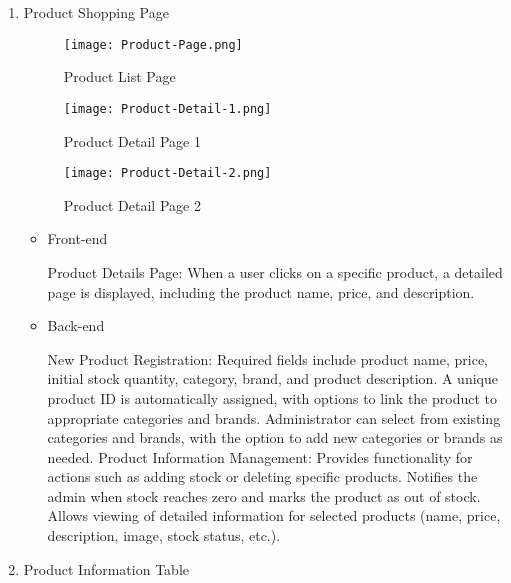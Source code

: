 \documentclass[conference]{IEEEtran}
\begin{document}
\begin{enumerate}
\setlength{\parindent}{2ex}
\item Product Shopping Page

\begin{figure}[H]
    \centering
    \texttt{[image: Product-Page.png]}
    \caption{Product List Page}
    \label{fig:Product List Page}
\end{figure}

\begin{figure}[H]
    \centering
    \texttt{[image: Product-Detail-1.png]}
    \caption{Product Detail Page 1}
    \label{fig:Product Detail Page 1}
\end{figure}

\begin{figure}[H]
    \centering
    \texttt{[image: Product-Detail-2.png]}
    \caption{Product Detail Page 2}
    \label{fig:Product Detail Page 2}
\end{figure}

\begin{itemize}
\setlength{\parindent}{2ex}
\item Front-end

Product Details Page: When a user clicks on a specific product, a detailed page is displayed, including the product name, price, and description.

\item Back-end

New Product Registration: Required fields include product name, price, initial stock quantity, category, brand, and product description. A unique product ID is automatically assigned, with options to link the product to appropriate categories and brands. Administrator can select from existing categories and brands, with the option to add new categories or brands as needed. \newline\hspace*{1.2ex}
Product Information Management: Provides functionality for actions such as adding stock or deleting specific products. Notifies the admin when stock reaches zero and marks the product as out of stock. Allows viewing of detailed information for selected products (name, price, description, image, stock status, etc.).
\end{itemize}

\item Product Information Table


\end{enumerate}
\end{document}
